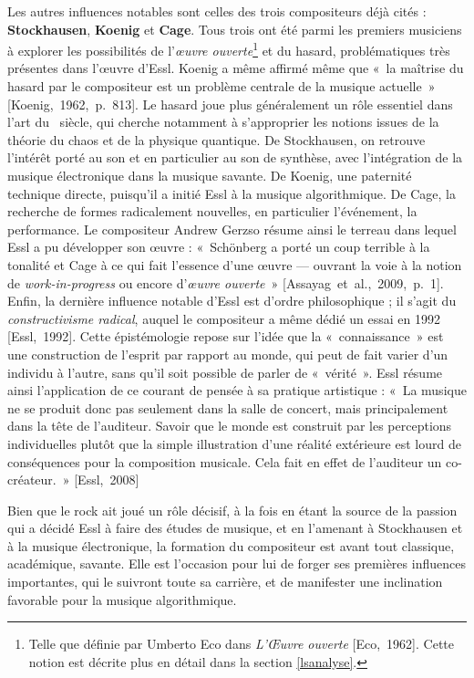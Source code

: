 \documentclass[a4paper,12pt]{article}
\newcommand{\guill}[1]{«~#1~»}
\newcommand{\cicite}[1]{{\footnotesize[#1]}}
\begin{document}
Les autres influences notables sont celles des trois compositeurs déjà cités : \textbf{Stockhausen}, \textbf{Koenig} et \textbf{Cage}. Tous trois ont été parmi les premiers musiciens à explorer les possibilités de l'\emph{œuvre ouverte}\footnote{Telle que définie par Umberto Eco dans \emph{L'Œuvre ouverte} \cicite{Eco,~1962}. Cette notion est décrite plus en détail dans la section \ref{lsanalyse}.} et du hasard, problématiques très présentes dans l'œuvre d'Essl. Koenig a même affirmé même que \guill{la maîtrise du hasard par le compositeur est un problème centrale de la musique actuelle} \cicite{Koenig,~1962,~p.~813}. Le hasard joue plus généralement un rôle essentiel dans l'art du \XXe~siècle, qui cherche notamment à s'approprier les notions issues de la théorie du chaos et de la physique quantique. De Stockhausen, on retrouve l'intérêt porté au son et en particulier au son de synthèse, avec l'intégration de la musique électronique dans la musique savante. De Koenig, une paternité technique directe, puisqu'il a initié Essl à la musique algorithmique. De Cage, la recherche de formes radicalement nouvelles, en particulier l'événement, la performance. Le compositeur Andrew Gerzso résume ainsi le terreau dans lequel Essl a pu développer son œuvre : \guill{Schönberg a porté un coup terrible à la tonalité et Cage à ce qui fait l'essence d'une œuvre --- ouvrant la voie à la notion de \emph{work-in-progress} ou encore d'\emph{œuvre ouverte}} \cicite{Assayag~et~al.,~2009,~p.~1}. \\
Enfin, la dernière influence notable d'Essl est d'ordre philosophique ; il s'agit du \emph{constructivisme radical}, auquel le compositeur a même dédié un essai en 1992 \cicite{Essl,~1992}. Cette épistémologie repose sur l'idée que la \guill{connaissance} est une construction de l'esprit par rapport au monde, qui peut de fait varier d'un individu à l'autre, sans qu'il soit possible de parler de \guill{vérité}. Essl résume ainsi l'application de ce courant de pensée à sa pratique artistique : \guill{La musique ne se produit donc pas seulement dans la salle de concert, mais principalement dans la tête de l'auditeur. Savoir que le monde est construit par les perceptions individuelles plutôt que la simple illustration d'une réalité extérieure est lourd de conséquences pour la composition musicale. Cela fait en effet de l'auditeur un co-créateur.} \cicite{Essl,~2008}

Bien que le rock ait joué un rôle décisif, à la fois en étant la source de la passion qui a décidé Essl à faire des études de musique, et en l'amenant à Stockhausen et à la musique électronique, la formation du compositeur est avant tout classique, académique, savante. Elle est l'occasion pour lui de forger ses premières influences importantes, qui le suivront toute sa carrière, et de manifester une inclination favorable pour la musique algorithmique.
\end{document}
